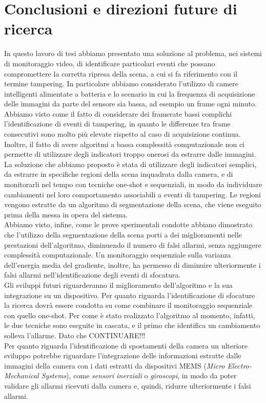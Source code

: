 \chapter{Conclusioni e direzioni future di ricerca}
\label{Conclusioni}
\thispagestyle{empty}

\noindent In questo lavoro di tesi abbiamo presentato una soluzione al problema, nei sistemi di monitoraggio video, di identificare particolari eventi che possano compromettere la corretta ripresa della scena, a cui si fa riferimento con il termine tampering.
In particolare abbiamo considerato l'utilizzo di camere intelligenti alimentate a batteria e lo scenario in cui la frequenza di acquisizione delle immagini da parte del sensore sia bassa, ad esempio un frame ogni minuto.\\
Abbiamo visto come il fatto di considerare dei framerate bassi complichi l'identificazione di eventi di tampering, in quanto le differenze tra frame consecutivi sono molto pi\`u elevate rispetto al caso di acquisizione continua. 
Inoltre, il fatto di avere algoritmi a bassa complessit\`a computazionale non ci permette di utilizzare degli indicatori troppo onerosi da estrarre dalle immagini.\\
La soluzione che abbiamo proposto \`e stata di utilizzare degli indicatori semplici, da estrarre in specifiche regioni della scena inquadrata dalla camera, e di monitorarli nel tempo con tecniche one-shot e sequenziali, in modo da individuare cambiamenti nel loro comportamento associabili a eventi di tampering.
Le regioni vengono estratte da un algoritmo di segmentazione della scena, che viene eseguito prima della messa in opera del sistema.\\
Abbiamo visto, infine, come le prove sperimentali condotte abbiano dimostrato che l'utilizzo della segmentazione della scena porti a dei miglioramenti nelle prestazioni dell'algoritmo, diminuendo il numero di falsi allarmi, senza aggiungere complessit\`a computazionale.
Un monitoraggio sequenziale sulla varianza dell'energia media del gradiente, inoltre, ha permesso di diminuire ulteriormente i falsi allarmi nell'identificazione degli eventi di sfocatura.\\
Gli sviluppi futuri riguarderanno il miglioramento dell'algoritmo e la sua integrazione su un dispositivo.
Per quanto riguarda l'identificazione di sfocature la ricerca dovr\`a essere condotta su come combinare il monitoraggio sequenziale con quello one-shot.
Per come \`e stato realizzato l'algoritmo al momento, infatti, le due tecniche sono eseguite in cascata, e il primo che identifica un cambiamento solleva l'allarme.
Dato che CONTINUARE!!!\\
Per quanto riguarda l'identificazione di spostamenti della camera un ulteriore sviluppo potrebbe riguardare l'integrazione delle informazioni estratte dalle immagini della camera con i dati estratti da dispositivi MEMS (\textit{Micro Electro-Mechanical Systems}), come \textit{sensori inerziali} o \textit{giroscopi}, in modo da poter validare gli allarmi ricevuti dalla camera e, quindi, ridurre ulteriormente i falsi allarmi.


